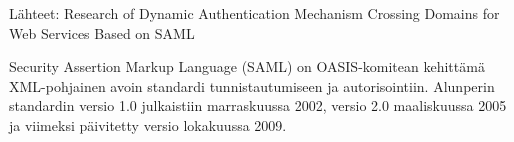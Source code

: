 Lähteet: 
Research of Dynamic Authentication Mechanism Crossing Domains for Web Services Based on SAML

Security Assertion Markup Language (SAML) on OASIS-komitean kehittämä XML-pohjainen avoin standardi tunnistautumiseen ja autorisointiin. Alunperin standardin versio 1.0 julkaistiin marraskuussa 2002, versio 2.0 maaliskuussa 2005 ja viimeksi päivitetty versio lokakuussa 2009.


